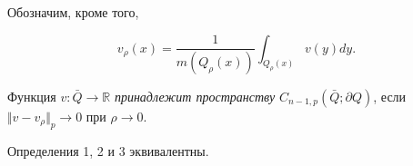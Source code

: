 Обозначим, кроме того, 

$$

v_{\rho}(x) = \frac{1}{m(Q_{\rho}(x))} \int_{Q_{\rho}(x)} v(y) dy.

$$



\smallskip



\begin{definition}[3]Функция $v:  \bar {Q} \to  {\mathbb R}$ {\it принадлежит пространству} \linebreak $C_{n-1,p}(\bar {Q} ; \partial Q)$, если $\Vert v - v _{\rho}\Vert_p \to 0$ при $\rho \to 0$.

\end{definition}



\smallskip



\begin{theorem}[6] Определения {\rm 1, 2} и {\rm 3} эквивалентны{\rm .}\end{theorem}



\smallskip




